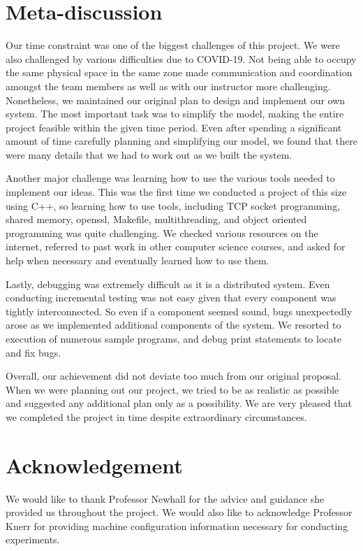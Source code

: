 \documentclass[11pt,twocolumn]{article}
\begin{document}
\section{Meta-discussion}\label{meta} 
Our time constraint was one of the biggest challenges of this project. We were also challenged by various difficulties due to COVID-19. Not being able to occupy the same physical space in the same zone made communication and coordination amongst the team members as well as with our instructor more challenging. Nonetheless, we maintained our original plan to design and implement our own system. The most important task was to simplify the model, making the entire project feasible within the given time period. Even after spending a significant amount of time carefully planning and simplifying our model, we found that there were many details that we had to work out as we built the system.

Another major challenge was learning how to use the various tools needed to implement our ideas. This was the first time we conducted a project of this size using C++, so learning how to use tools, including TCP socket programming, shared memory, openssl, Makefile, multithreading, and object oriented programming was quite challenging. We checked various resources on the internet, referred to past work in other computer science courses, and asked for help when necessary and eventually learned how to use them.

Lastly, debugging was extremely difficult as it is a distributed system. Even conducting incremental testing was not easy given that every component was tightly interconnected. So even if a component seemed sound, bugs unexpectedly arose as we implemented additional components of the system. We resorted to execution of numerous sample programs, and debug print statements to locate and fix bugs. 

Overall, our achievement did not deviate too much from our original proposal. When we were planning out our project, we tried to be as realistic as possible and suggested any additional plan only as a possibility. We are very pleased that we completed the project in time despite extraordinary circumstances. 

\section{Acknowledgement}\label{ackn}
We would like to thank Professor Newhall for the advice and guidance she provided us throughout the project. We would also like to acknowledge Professor Knerr for providing machine configuration information necessary for conducting experiments. 



\end{document}
